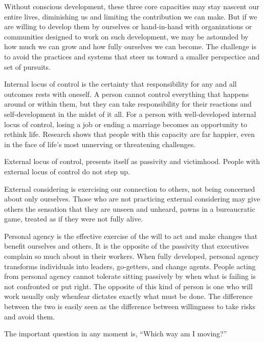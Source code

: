 \documentclass[ebook,12pt,oneside,openany]{memoir}
\begin{document}
Without conscious development, these three core capacities may stay nascent our entire lives, diminishing us and limiting the contribution we can make. 
But if we are willing to develop them by ourselves or hand-in-hand with organizations or communities designed to work on such development, we may be astounded by how much we can grow and how fully ourselves we can become.
The challenge is to avoid the practices and systems that steer us toward a smaller perspectice and set of pursuits.

Internal locus of control is the certainty that responsibility for any and all outcomes rests with oneself. A person cannot control everything that happens around or within them, but they can take responsibility for their reactions and self-development in the midst of it all.
For a person with well-developed internal locus of control, losing a job or ending a marriage becomes an opportunity to rethink life. Research shows that people with this capacity are far happier, even in the face of life's most unnerving or threatening challenges.

External locus of control, presents itself as passivity and victimhood. People with external locus of control do not step up. 

External considering is exercising our connection to others, not being concerned about only ourselves. Those who are not practicing external considering may give others the sensation that they are unseen and unheard, pawns in a bureaucratic game, treated as if they were not fully alive.

Personal agency is the effective exercise of the will to act and make changes that benefit ourselves and others. It is the opposite of the passivity that executives complain so much about in their workers.
When fully developed, personal agency transforms individuals into leaders, go-getters, and change agents. People acting from personal agency cannot tolerate sitting passively by when what is failing is not confronted or put right.
The opposite of this kind of person is one who will work usually only whenfear dictates exactly what must be done.
The difference between the two is easily seen as the difference between willingness to take risks and avoid them.

The important question in any moment is, ``Which way am I moving?''
\end{document}
